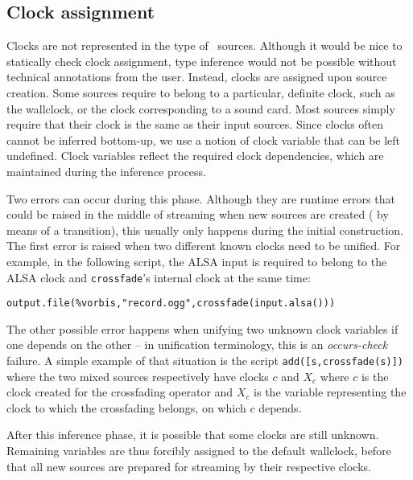 
\subsection{Clock assignment}

Clocks are not represented in the type of \liquidsoap\ sources.
Although it would be nice to statically check clock assignment,
type inference would not be possible without technical annotations
from the user. Instead, clocks are assigned upon source creation.
Some sources require to belong to a particular, definite clock,
such as the wallclock, or the clock corresponding to a sound card.
Most sources simply require that their clock is the same as their
input sources.
Since clocks often cannot be inferred bottom-up, we use a notion
of clock variable that can be left undefined.
Clock variables reflect the required clock dependencies,
which are maintained during the inference process.

Two errors can occur during this phase.
Although they are runtime errors that could be raised
in the middle of streaming when new sources are created
(\eg{} by means of a transition),
this usually only happens during the initial construction.
The first error is raised when
two different known clocks need to be unified.
For example, in the following script, the ALSA input is
required to belong to the ALSA clock and \verb.crossfade.'s internal clock
at the same time:
\begin{verbatim}
output.file(%vorbis,"record.ogg",crossfade(input.alsa()))
\end{verbatim}
The other possible error happens when unifying two unknown clock variables
if one depends on the other -- in unification terminology, this is an
\emph{occurs-check} failure. A simple example of that situation is
the script \verb.add([s,crossfade(s)]). where the two mixed sources
respectively have clocks $c$ and $X_c$ where $c$ is the clock created
for the crossfading operator and $X_c$ is the variable representing
the clock to which the crossfading belongs, on which $c$ depends.

After this inference phase, it is possible that some clocks are still
unknown. Remaining variables are thus forcibly assigned to the default
wallclock, before that all new sources are prepared for streaming
by their respective clocks.
